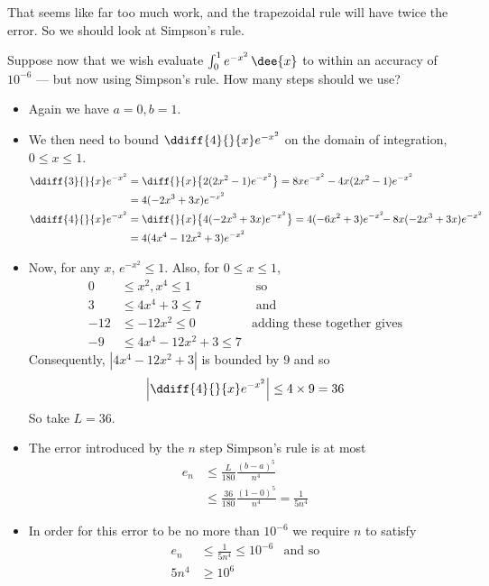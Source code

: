 That seems like far too much work, and the trapezoidal rule will have twice the error. So
we should look at Simpson's rule.
\begin{eg}\label{eg:SimpsonErr}
Suppose now that we wish evaluate $\int_0^1 e^{-x^2}\,\dee{x}$ to within an accuracy of
$10^{-6}$ --- but now using Simpson's rule. How many steps should we use?

\soln
\begin{itemize}
 \item Again we have $a=0,b=1$.
\item We then need to bound $\ddiff{4}{}{x}e^{-x^2}$ on the domain of integration, $0\leq
x\leq 1$.
\begin{align*}
\ddiff{3}{}{x}e^{-x^2}
   &=\diff{}{x}\big\{2(2x^2-1)e^{-x^2}\big\}
    =8xe^{-x^2}-4x(2x^2-1)e^{-x^2}\\
   &=4(-2x^3+3x)e^{-x^2}\\
\ddiff{4}{}{x}e^{-x^2}
   &=\diff{}{x}\big\{4(-2x^3+3x)e^{-x^2}\big\}
  =4(-6x^2+3)e^{-x^2}\hskip-4pt-8x(-2x^3+3x)e^{-x^2}\\
  &=4(4x^4-12x^2+3)e^{-x^2}
\end{align*}
\item Now, for any $x$,  $e^{-x^2}\le 1$. Also, for $0\le x\le 1$,
\begin{align*}
  0 & \leq x^2, x^4 \leq 1 & \text{ so}\\
  3 & \leq 4x^4+3 \leq 7 & \text{ and }\\
  -12 & \leq -12x^2 \leq 0 & \text{adding these together gives}\\
  -9 & \leq 4x^4-12x^2 + 3 \leq 7
\end{align*}
 Consequently, $|4x^4-12x^2+3|$ is bounded by $9$ and so
\begin{align*}
\left|\ddiff{4}{}{x}e^{-x^2}\right| \leq 4\times 9=36
\end{align*}
So take $L=36$.
\item The error introduced by the $n$ step Simpson's rule is at most
\begin{align*}
  e_n & \leq \frac{L}{180}\frac{(b-a)^5}{n^4}\\
  & \leq \frac{36}{180} \frac{(1-0)^5}{n^4} = \frac{1}{5n^4}
\end{align*}
\item In order for this error to be no more than $10^{-6}$ we require $n$ to satisfy
\begin{align*}
  e_n &\leq \frac{1}{5n^4} \leq 10^{-6} & \text{and so}\\
  5n^4 & \geq 10^6 \\

\end{align*}
\end{itemize}
\end{eg}

